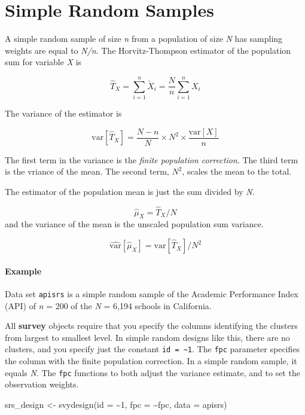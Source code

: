 \documentclass[
]{book}
\newenvironment{Shaded}{\begin{snugshade}}{\end{snugshade}}
\newcommand{\AttributeTok}[1]{\textcolor[rgb]{0.77,0.63,0.00}{#1}}
\newcommand{\DecValTok}[1]{\textcolor[rgb]{0.00,0.00,0.81}{#1}}
\newcommand{\FunctionTok}[1]{\textcolor[rgb]{0.00,0.00,0.00}{#1}}
\newcommand{\NormalTok}[1]{#1}
\newcommand{\OtherTok}[1]{\textcolor[rgb]{0.56,0.35,0.01}{#1}}
\newcommand{\SpecialCharTok}[1]{\textcolor[rgb]{0.00,0.00,0.00}{#1}}
\theoremstyle{definition}
\theoremstyle{definition}
\theoremstyle{definition}
\theoremstyle{definition}
\theoremstyle{remark}
\begin{document}
\hypertarget{simple}{%
\chapter{Simple Random Samples}\label{simple}}

A simple random sample of size \emph{n} from a population of size \emph{N} has sampling weights are equal to \emph{N/n}. The Horvitz-Thompson estimator of the population sum for variable \emph{X} is

\[\hat{T}_X = \sum_{i=1}^n \check{X}_i = \frac{N}{n} \sum_{i=1}^n X_i\]

The variance of the estimator is

\[\mathrm{var} [\hat{T}_X] = \frac{N - n}{N} \times N^2 \times \frac{\mathrm{var}[X]}{n}\]

The first term in the variance is the \emph{finite population correction}. The third term is the vriance of the mean. The second term, \(N^2\), scales the mean to the total.

The estimator of the population mean is just the sum divided by \emph{N}.

\[\hat{\mu}_X = \hat{T}_X / N\]
and the variance of the mean is the unscaled population sum variance.

\[\hat{\mathrm{var}}[\hat{\mu}_X] = \mathrm{var} [\hat{T}_X] / N^2\]

\hypertarget{example}{%
\subsubsection*{Example}\label{example}}

Data set \texttt{apisrs} is a simple random sample of the Academic Performance Index (API) of \emph{n} = 200 of the \emph{N} = 6,194 schools in California.

All \textbf{survey} objects require that you specify the columns identifying the clusters from largest to smallest level. In simple random designs like this, there are no clusters, and you specify just the constant \texttt{id\ =\ \textasciitilde{}1}. The \texttt{fpc} parameter specifies the column with the finite population correction. In a simple random sample, it equals \emph{N}. The \texttt{fpc} functions to both adjust the variance estimate, and to set the observation weights.

\begin{Shaded}
\begin{Highlighting}[]
\NormalTok{srs\_design }\OtherTok{\textless{}{-}} \FunctionTok{svydesign}\NormalTok{(}\AttributeTok{id =} \SpecialCharTok{\textasciitilde{}}\DecValTok{1}\NormalTok{,  }\AttributeTok{fpc =} \SpecialCharTok{\textasciitilde{}}\NormalTok{fpc, }\AttributeTok{data =}\NormalTok{ apisrs)}
\end{Highlighting}
\end{Shaded}
\end{document}
